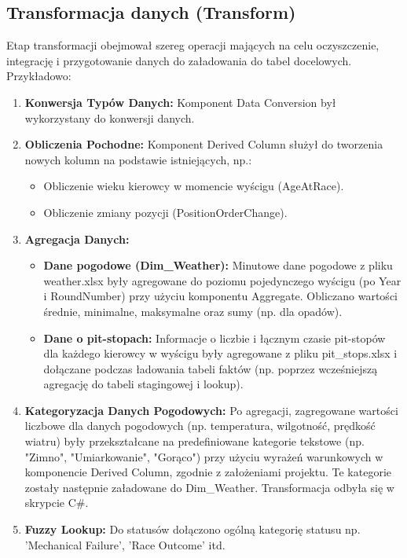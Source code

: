 \documentclass[a4paper,12pt]{article}
\begin{document}
\subsection{Transformacja danych (Transform)}
Etap transformacji obejmował szereg operacji mających na celu oczyszczenie, integrację i przygotowanie danych do załadowania do tabel docelowych. Przykładowo:
\begin{enumerate}
  \item \textbf{Konwersja Typów Danych:} Komponent Data Conversion był wykorzystany do konwersji danych.
  \item \textbf{Obliczenia Pochodne:} Komponent Derived Column służył do tworzenia nowych kolumn na podstawie istniejących, np.:
        \begin{itemize}
          \item Obliczenie wieku kierowcy w momencie wyścigu (AgeAtRace).
          \item Obliczenie zmiany pozycji (PositionOrderChange).
        \end{itemize}
  \item \textbf{Agregacja Danych:}
        \begin{itemize}
          \item \textbf{Dane pogodowe (Dim\_Weather):} Minutowe dane pogodowe z pliku weather.xlsx były agregowane do poziomu pojedynczego wyścigu (po Year i RoundNumber) przy użyciu komponentu Aggregate. Obliczano wartości średnie, minimalne, maksymalne oraz sumy (np. dla opadów).
          \item \textbf{Dane o pit-stopach:} Informacje o liczbie i łącznym czasie pit-stopów dla każdego kierowcy w wyścigu były agregowane z pliku pit\_stops.xlsx i dołączane podczas ładowania tabeli faktów (np. poprzez wcześniejszą agregację do tabeli stagingowej i lookup).
        \end{itemize}
  \item \textbf{Kategoryzacja Danych Pogodowych:} Po agregacji, zagregowane wartości liczbowe dla danych pogodowych (np. temperatura, wilgotność, prędkość wiatru) były przekształcane na predefiniowane kategorie
        tekstowe (np. "Zimno", "Umiarkowanie", "Gorąco") przy użyciu wyrażeń warunkowych w komponencie Derived Column, zgodnie z założeniami projektu. Te kategorie zostały następnie załadowane do Dim\_Weather. Transformacja odbyła się w skrypcie C\#.
  \item \textbf{Fuzzy Lookup:} Do statusów dołączono ogólną kategorię statusu np. 'Mechanical Failure', 'Race Outcome' itd.
\end{enumerate}
\end{document}
